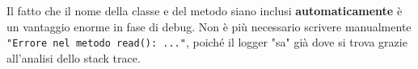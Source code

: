 \medskip

Il fatto che il nome della classe e del metodo siano inclusi \textbf{automaticamente} è un vantaggio enorme in fase di debug. Non è più necessario scrivere manualmente \texttt{"Errore nel metodo read(): ..."}, poiché il logger "sa" già dove si trova grazie all'analisi dello stack trace.





